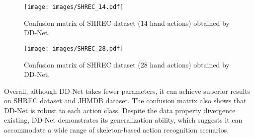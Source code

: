 \documentclass[journal]{IEEEtran}
\begin{document}
\tabcolsep=5pt
\begin{table}[!h]
\renewcommand{\arraystretch}{1.3}
\caption{Results on JHMDB (Using 2D skeletons only) \cite{Jhuang:ICCV:2013}}
\label{table:JHMDB}
\centering
{}
\end{table}


\begin{figure}[!htb]
\centering
  \texttt{[image: images/SHREC\_14.pdf]}
  \caption{Confusion matrix of SHREC dataset (14 hand actions) obtained by DD-Net.}
  \label{fig:cm_14}
\end{figure}

\begin{figure*}[!htb]
\centering
  \texttt{[image: images/SHREC\_28.pdf]}
  \caption{Confusion matrix of SHREC dataset (28 hand actions) obtained by DD-Net.}
  \label{fig:cm_28}
\end{figure*}


Overall, although DD-Net takes fewer parameters, it can achieve superior results on SHREC dataset and JHMDB dataset. The confusion matrix also shows that DD-Net is robust to each action class. Despite the data property divergence existing, DD-Net demonstrates its generalization ability, which suggests it can accommodate a wide range of skeleton-based action recognition scenarios.
\end{document}
